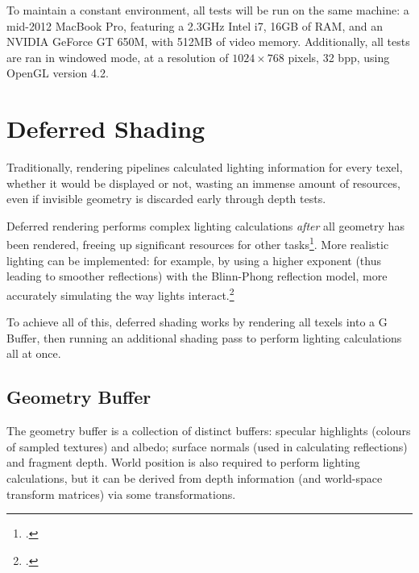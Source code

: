 \documentclass[11pt, oneside]{report}
\begin{document}
To maintain a constant environment, all tests will be run on the same machine: a mid-2012 MacBook Pro, featuring a 2.3GHz Intel i7, 16GB of RAM, and an NVIDIA GeForce GT 650M, with 512MB of video memory. Additionally, all tests are ran in windowed mode, at a resolution of $1024 \times 768$ pixels, 32 \gls{bpp}, using \gls{OpenGL} version 4.2.

\chapter{Deferred Shading}
Traditionally, rendering pipelines calculated lighting information for every \gls{texel}, whether it would be displayed or not, wasting an immense amount of resources, even if invisible geometry is discarded early through \glspl{depth test}.

Deferred rendering performs complex lighting calculations \textit{after} all geometry has been rendered, freeing up significant resources for other tasks\footcite{gpupro-deferred}. More realistic lighting can be implemented: for example, by using a higher exponent (thus leading to smoother reflections) with the \gls{Blinn-Phong reflection model}, more accurately simulating the way lights interact.\footcite{ferko-deferred}

To achieve all of this, deferred shading works by rendering all texels into a \gls{G Buffer}, then running an additional shading pass to perform lighting calculations all at once.

\section{Geometry Buffer}
The geometry buffer is a collection of distinct buffers: \gls{specular} highlights (colours of sampled textures) and albedo; surface normals (used in calculating reflections) and fragment depth. World position is also required to perform lighting calculations, but it can be derived from depth information (and world-space transform matrices) via some transformations.
\end{document}
